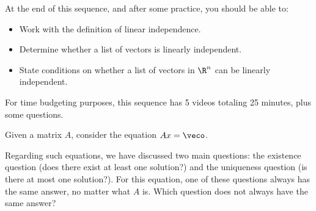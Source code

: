 

\usepackage{enumerate}







At the end of this sequence, and after some practice, you should be able to:

\begin{itemize}
\item Work with the definition of linear independence.  
\item Determine whether a list of vectors is linearly independent. 
\item State conditions on whether a list of vectors in $\R^n$ can be linearly independent.
\end{itemize}


For time budgeting purposes, this sequence has 5 videos totaling 25 minutes, 
plus some questions.  




\endedxtext

\endedxvertical





Given a matrix $A$, consider the equation $Ax = \veco$.   

Regarding such equations, we have discussed two main questions: the existence question
(does there exist at least one solution?) and the uniqueness question (is there at most one
solution?).  For this equation, one of these questions always has the same answer, no matter
what $A$ is.  Which question does not always have the same answer?  



\endedxproblem



